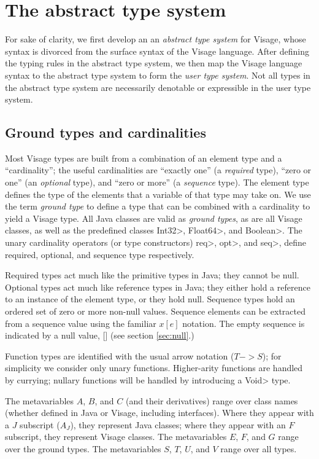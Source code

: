 \documentclass{article}
\newcommand{\sqb}{\texttt{[]}}
\begin{document}
\section{The abstract type system}

For sake of clarity, we first develop an an \emph{abstract type
system} for Visage, whose syntax is divorced from the surface syntax
of the Visage language.  After defining the typing rules in the
abstract type system, we then map the Visage language syntax to the
abstract type system to form the \emph{user type system}.  Not all
types in the abstract type system are necessarily denotable or
expressible in the user type system.

\subsection{Ground types and cardinalities}

Most Visage types are built from a combination of an element type and
a ``cardinality''; the useful cardinalities are ``exactly one'' (a
\emph{required} type), ``zero or one'' (an \emph{optional} type), and
``zero or more'' (a \emph{sequence} type).  The element type defines
the type of the elements that a variable of that type may take on.  We
use the term \emph{ground type} to define a type that can be combined
with a cardinality to yield a Visage type.  All Java classes are valid
as \emph{ground types}, as are all Visage classes, as well as the
predefined classes \<Int32>, \<Float64>, and \<Boolean>.  The unary
cardinality operators (or type constructors) \<req>, \<opt>, and
\<seq>, define required, optional, and sequence type respectively.

Required types act much like the primitive types in Java; they cannot
be null.  Optional types act much like reference types in Java; they
either hold a reference to an instance of the element type, or they
hold null.  Sequence types hold an ordered set of zero or more non-null values.  
Sequence elements can be extracted from a sequence value using the familiar
$x[e]$ notation.  The empty sequence is indicated by a null value, $\sqb$ (see section \ref{sec:null}.)  

Function types are identified with the usual arrow notation ($T ->
S$); for simplicity we consider only unary functions.  Higher-arity
functions are handled by currying; nullary functions will be handled
by introducing a \<Void> type.

The metavariables $A$, $B$, and $C$ (and their derivatives) range over
class names (whether defined in Java or Visage, including interfaces).  Where
they appear with a $J$ subscript ($A_J$), they represent Java classes; where they
appear with an $F$ subscript, they represent Visage classes.  
The metavariables $E$, $F$, and $G$ range over the ground types.  The
metavariables $S$, $T$, $U$, and $V$ range over all types.
\end{document}
